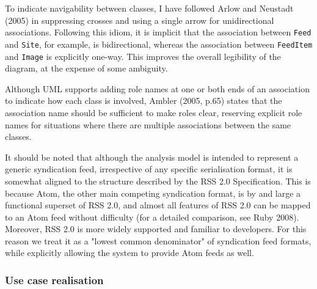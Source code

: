\documentclass{article}
\begin{document}
To indicate navigability between classes, I have followed Arlow and Neustadt (2005) in suppressing crosses and using a single arrow for unidirectional associations. Following this idiom, it is implicit that the association between \texttt{Feed} and \texttt{Site}, for example, is bidirectional, whereas the association between \texttt{FeedItem} and \texttt{Image} is explicitly one-way. This improves the overall legibility of the diagram, at the expense of some ambiguity.

Although UML supports adding role names at one or both ends of an association to indicate how each class is involved, Ambler (2005, p.65) states that the association name should be sufficient to make roles clear, reserving explicit role names for situations where there are multiple associations between the same classes.

It should be noted that although the analysis model is intended to represent a generic syndication feed, irrespective of any specific serialisation format, it is somewhat aligned to the structure described by the RSS 2.0 Specification\cite{rss}. This is because Atom, the other main competing syndication format, is by and large a functional superset of RSS 2.0, and almost all features of RSS 2.0 can be mapped to an Atom feed without difficulty (for a detailed comparison, see Ruby 2008). Moreover, RSS 2.0 is more widely supported and familiar to developers. For this reason we treat it as a "lowest common denominator" of syndication feed formats, while explicitly allowing the system to provide Atom feeds as well.



\subsubsection{Use case realisation}

\end{document}
